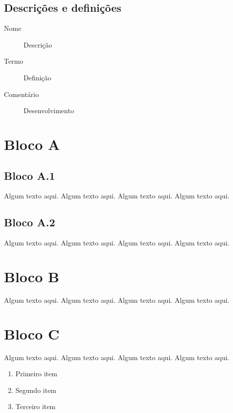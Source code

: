 \subsection{Descrições e definições}

\begin{description}
\item[Nome] Descrição
\item[Termo] Definição
\item[Comentário] Desenvolvimento
\end{description}

\section{Bloco A}

\subsection{Bloco A.1}

\begin{theorem}[Nome]
Algum texto aqui. Algum texto aqui. Algum texto aqui. Algum texto aqui.
\end{theorem}

\subsection{Bloco A.2}

\begin{theorem}
Algum texto aqui. Algum texto aqui. Algum texto aqui. Algum texto aqui.
\end{theorem}

\section{Bloco B}

\begin{definition}[Nome]
Algum texto aqui. Algum texto aqui. Algum texto aqui. Algum texto aqui. 
\end{definition}

\section{Bloco C}

\begin{notation}
Algum texto aqui. Algum texto aqui. Algum texto aqui. Algum texto aqui. 
\begin{enumerate}
\item Primeiro item
\item Segundo item
\item Terceiro item
\end{enumerate} 
\end{notation}


